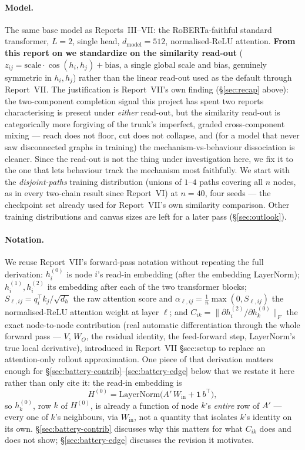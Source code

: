 \documentclass[11pt,a4paper]{article}
\begin{document}
\paragraph{Model.} The same base model as Reports~III--VII: the
RoBERTa-faithful standard transformer, $L=2$, single head,
$d_{\mathrm{model}}=512$, normalised-ReLU attention. \textbf{From this report
on we standardize on the similarity read-out}
($z_{ij}=\mathrm{scale}\cdot\cos(h_i,h_j)+\mathrm{bias}$, a single global
scale and bias, genuinely symmetric in $h_i,h_j$) rather than the linear
read-out used as the default through Report~VII. The justification is
Report~VII's own finding (\S\ref{sec:recap} above): the two-component
completion signal this project has spent two reports characterising is
present under \emph{either} read-out, but the similarity read-out is
categorically more forgiving of the trunk's imperfect, graded cross-component
mixing --- reach does not floor, cut does not collapse, and (for a model that
never saw disconnected graphs in training) the mechanism-vs-behaviour
dissociation is cleaner. Since the read-out is not the thing under
investigation here, we fix it to the one that lets behaviour track the
mechanism most faithfully. We start with the \emph{disjoint-paths} training
distribution (unions of $1$--$4$ paths covering all $n$ nodes, as in every
two-chain result since Report~VI) at $n=40$, four seeds --- the checkpoint set
already used for Report~VII's own similarity comparison. Other training
distributions and canvas sizes are left for a later pass (\S\ref{sec:outlook}).

\paragraph{Notation.} We reuse Report~VII's forward-pass notation without
repeating the full derivation: $h_i^{(0)}$ is node $i$'s read-in embedding
(after the embedding LayerNorm); $h_i^{(1)}, h_i^{(2)}$ its embedding after
each of the two transformer blocks; $S_{\ell,ij}=q_{i}^\top k_{j}/\sqrt{d_h}$
the raw attention score and $\alpha_{\ell,ij}=\tfrac1n\max(0,S_{\ell,ij})$ the
normalised-ReLU attention weight at layer $\ell$; and
$C_{ik}=\|\partial h_i^{(2)}/\partial h_k^{(0)}\|_F$ the exact node-to-node
contribution (real automatic differentiation through the whole forward pass
--- $V$, $W_O$, the residual identity, the feed-forward step, LayerNorm's true
local derivative), introduced in Report~VII \S sec:setup to replace an
attention-only rollout approximation. One piece of that derivation matters
enough for \S\ref{sec:battery-contrib}--\ref{sec:battery-edge} below that we
restate it here rather than only cite it: the read-in embedding is
\[ H^{(0)} = \mathrm{LayerNorm}\big(A'\,W_{\mathrm{in}} + \mathbf 1\, b^\top\big), \]
so $h_k^{(0)}$, row $k$ of $H^{(0)}$, is already a function of node $k$'s
\emph{entire} row of $A'$ --- every one of $k$'s neighbours, via
$W_{\mathrm{in}}$, not a quantity that isolates $k$'s identity on its own.
\S\ref{sec:battery-contrib} discusses why this matters for what $C_{ik}$ does
and does not show; \S\ref{sec:battery-edge} discusses the revision it
motivates.
\end{document}
